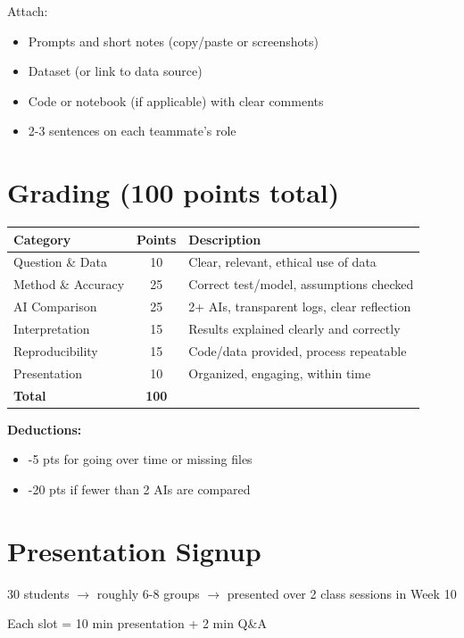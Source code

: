 \documentclass[11pt]{article}
\begin{document}
Attach:
\begin{itemize}
\item Prompts and short notes (copy/paste or screenshots)
\item Dataset (or link to data source)
\item Code or notebook (if applicable) with clear comments
\item 2-3 sentences on each teammate's role
\end{itemize}

\section{Grading (100 points total)}

\begin{center}
\begin{tabular}{lcp{8cm}}
\toprule
\textbf{Category} & \textbf{Points} & \textbf{Description} \\
\midrule
Question \& Data & 10 & Clear, relevant, ethical use of data \\
Method \& Accuracy & 25 & Correct test/model, assumptions checked \\
AI Comparison & 25 & 2+ AIs, transparent logs, clear reflection \\
Interpretation & 15 & Results explained clearly and correctly \\
Reproducibility & 15 & Code/data provided, process repeatable \\
Presentation & 10 & Organized, engaging, within time \\
\midrule
\textbf{Total} & \textbf{100} & \\
\bottomrule
\end{tabular}
\end{center}

\textbf{Deductions:}
\begin{itemize}
\item -5 pts for going over time or missing files
\item -20 pts if fewer than 2 AIs are compared
\end{itemize}

\section{Presentation Signup}

30 students $\rightarrow$ roughly 6-8 groups $\rightarrow$ presented over 2 class sessions in Week 10

Each slot = 10 min presentation + 2 min Q\&A
\end{document}
